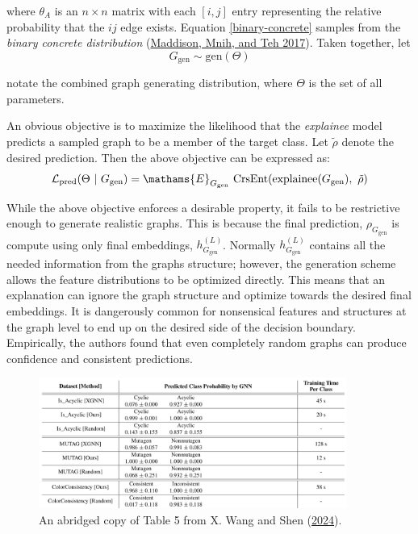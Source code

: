 \documentclass[
  11pt,
  letterpaper,
]{article}
\begin{document}
where \(\theta_A\) is an \(n \times n\) matrix with each \([i, j]\)
entry representing the relative probability that the \(ij\) edge exists.
Equation \ref{binary-concrete} samples from the \emph{binary concrete
distribution} (\protect\hyperlink{ref-Maddison_Mnih_Teh_2017}{Maddison,
Mnih, and Teh 2017}). Taken together, let\\
\[
    G_{\text{gen}} \sim \text{gen}(\Theta)  
\]

notate the combined graph generating distribution, where \(\Theta\) is
the set of all parameters.

\quad An obvious objective is to maximize the likelihood that the
\emph{explainee} model predicts a sampled graph to be a member of the
target class. Let \(\tilde{\rho}\) denote the desired prediction. Then
the above objective can be expressed as: \begin{equation} \label{l-pred}
    \mathcal{L}_\text{pred} (\Theta \ | \ G_\text{gen}) = \mathams{E}_{G_\text{gen}} \ \text{CrsEnt} (\text{explainee}(G_\text{gen}), \ \tilde{\rho})
\end{equation}

While the above objective enforces a desirable property, it fails to be
restrictive enough to generate realistic graphs. This is because the
final prediction, \(\rho_{G_{\text{gen}}}\) is compute using only final
embeddings, \(h^{(L)}_{G_{\text{gen}}}\). Normally
\(h^{(L)}_{G_{\text{gen}}}\) contains all the needed information from
the graphs structure; however, the generation scheme allows the feature
distributions to be optimized directly. This means that an explanation
can ignore the graph structure and optimize towards the desired final
embeddings. It is dangerously common for nonsensical features and
structures at the graph level to end up on the desired side of the
decision boundary. Empirically, the authors found that even completely
random graphs can produce confidence and consistent predictions.

\begin{figure}

{\centering \includegraphics[width=0.9\textwidth,height=\textheight]{figures/random_baseline.png}

}

\caption{\label{fig-random-baseline}An abridged copy of Table 5 from X.
Wang and Shen (\protect\hyperlink{ref-Wang_Shen_2024}{2024}).}

\end{figure}
\end{document}
